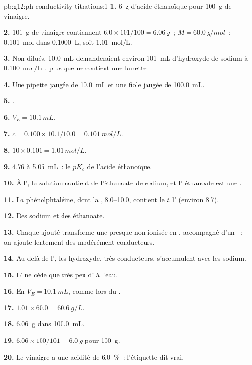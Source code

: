 \begin{solution}{pb:g12:ph-conductivity-titrations:1}
\textbf{1.} \qty{6}{g} d'acide éthanoïque pour \qty{100}{g} de vinaigre.

\textbf{2.} \qty{101}{g} de vinaigre contiennent $6.0 \times 101/100 =
\qty{6.06}{g}$~; $M = \qty{60.0}{g/mol}$~: \qty{0.101}{mol} dans
\qty{0.1000}{L}, soit \qty{1.01}{mol/L}.

\textbf{3.} Non dilués, \qty{10.0}{mL} demanderaient environ
\qty{101}{mL} d'hydroxyde de sodium à \qty{0.100}{mol/L}~: plus que ne
contient une burette.

\textbf{4.} Une pipette jaugée de \qty{10.0}{mL} et une fiole jaugée de
\qty{100.0}{mL}.

\textbf{5.} .

\textbf{6.} $V_E = \qty{10.1}{mL}$.

\textbf{7.} $c = 0.100 \times 10.1 / 10.0 = \qty{0.101}{mol/L}$.

\textbf{8.} $10 \times 0.101 = \qty{1.01}{mol/L}$.

\textbf{9.}  4.76 à \qty{5.05}{mL}~: le $pK_a$ de l'acide éthanoïque.

\textbf{10.} À l', la solution contient de l'éthanoate de
sodium, et l' éthanoate est une .

\textbf{11.} La phénolphtaléine, dont la , 8.0--10.0,
contient le  à l' (environ 8.7).

\textbf{12.} Des  sodium et des  éthanoate.

\textbf{13.} Chaque   ajouté transforme une  presque
non ionisée en
, accompagné d'un  ~: on ajoute lentement des
 modérément conducteurs.

\textbf{14.} Au-delà de l', les  hydroxyde, très
conducteurs, s'accumulent avec les  sodium.

\textbf{15.} L' ne cède que très peu d' à l'eau.

\textbf{16.} En $V_E = \qty{10.1}{mL}$, comme lors du .

\textbf{17.} $1.01 \times 60.0 = \qty{60.6}{g/L}$.

\textbf{18.} \qty{6.06}{g} dans \qty{100.0}{mL}.

\textbf{19.} $6.06 \times 100 / 101 = \qty{6.0}{g}$ pour \qty{100}{g}.

\textbf{20.} Le vinaigre a une acidité de \qty{6.0}{\percent}~: l'étiquette dit
vrai.
\end{solution}
